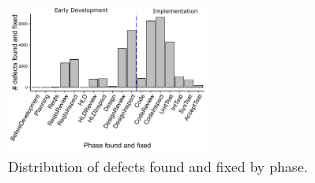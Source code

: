 \documentclass[smallcondesed]{svjour3}
\begin{document}
 
 

\begin{figure}[!t] 
 
\begin{center}
\hspace{-1.5in}\includegraphics[height=1.5in]{img/fix-phase-dist.pdf}
\end{center} 
\vspace{2 cm}

\caption{Distribution of defects found and fixed by phase.}
\label{fig:fix-phase-dist}
\end{figure}
\end{document}
